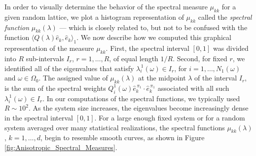 \documentclass{cmslatex}
\begin{document}
In order to visually determine the behavior of the spectral measure
$\mu_{kk}$ for a given random lattice, we plot a histogram representation
of $\mu_{kk}$ called the \emph{spectral function} $\mu_{kk}(\lambda)$ --- which is
closely related to, but not to be confused with the function $\langle
Q(\lambda)\hat{e}_k,\hat{e}_k\rangle_1$. We now describe how 
we computed this graphical representation of the measure
$\mu_{kk}$. First, the spectral interval $[0,1]$ was divided into $R$
sub-intervals $I_r$, $r=1,\ldots,R$, of equal length $1/R$. Second, for
fixed $r$, we identified all of the eigenvalues that satisfy
$\lambda^{\,1}_i(\omega)\in I_r$, for $i=1,\ldots,N_1(\omega)$ and $\omega\in\Omega_0$. The assigned
value of $\mu_{kk}(\lambda)$ at the midpoint $\lambda$ of the interval $I_r$, is the
sum of the spectral weights
$Q^1_i(\omega)\hat{e}_k^{\,\pi_1}\cdot\hat{e}_k^{\,\pi_1}$ associated with all such
$\lambda^{\,1}_i(\omega)\in I_r$. In our computations of the spectral functions, we 
typically used $R\sim10^2$. As the system size increases, the eigenvalues
become increasingly dense in the spectral interval $[0,1]$. For a
large enough fixed system or for a random system averaged over many
statistical realizations, the spectral functions $\mu_{kk}(\lambda)$,
$k=1,\ldots,d$, begin to resemble smooth curves, as shown in Figure 
\ref{fig:Anisotropic_Spectral_Measures}.     
\end{document}
